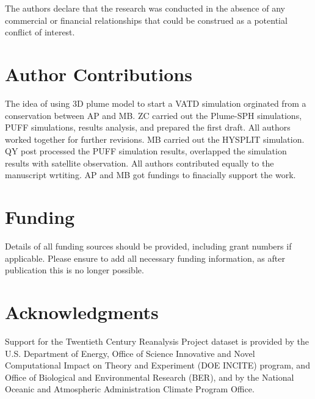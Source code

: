 \documentclass[utf8]{frontiersSCNS} %
\begin{document}
The authors declare that the research was conducted in the absence of any commercial or financial relationships that could be construed as a potential conflict of interest.

\section*{Author Contributions}
The idea of using 3D plume model to start a VATD simulation orginated from a conservation between AP and MB. ZC carried out the Plume-SPH simulations, PUFF simulations, results analysis, and prepared the first draft. All authors worked together for further revisions.  MB carried out the HYSPLIT simulation. QY post processed the PUFF simulation results, overlapped the simulation results with satellite observation. All authors contributed equally to the manuscript wrtiting. AP and MB got fundings to finacially support the work.

\section*{Funding}
Details of all funding sources should be provided, including grant numbers if applicable. Please ensure to add all necessary funding information, as after publication this is no longer possible.

\section*{Acknowledgments}
Support for the Twentieth Century Reanalysis Project dataset is provided by the U.S. Department of Energy, Office of Science Innovative and Novel Computational Impact on Theory and Experiment (DOE INCITE) program, and Office of Biological and Environmental Research (BER), and by the National Oceanic and Atmospheric Administration Climate Program Office.


\end{document}
